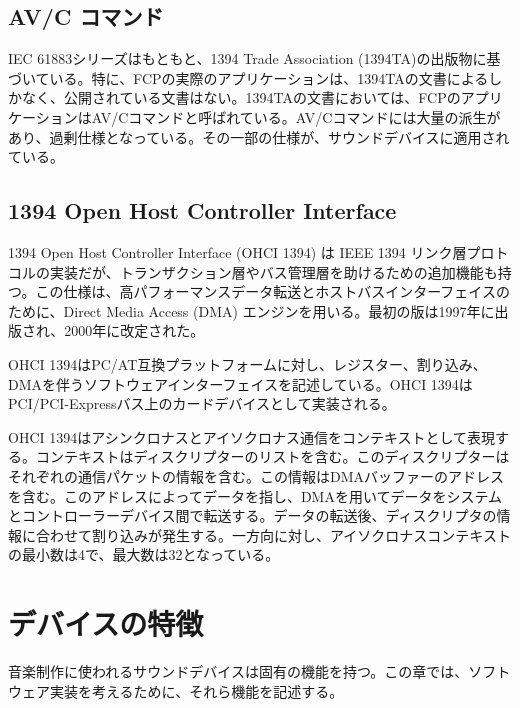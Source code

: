 \documentclass[onecolumn]{jarticle}
\begin{document}
\subsection{AV/C コマンド}

IEC 61883シリーズはもともと、1394 Trade Association (1394TA)の出版物に基づいている。特に、FCPの実際のアプリケーションは、1394TAの文書によるしかなく、公開されている文書はない。1394TAの文書においては、FCPのアプリケーションはAV/Cコマンドと呼ばれている。AV/Cコマンドには大量の派生があり、過剰仕様となっている。その一部の仕様が、サウンドデバイスに適用されている\cite{avc-general-4-2, avc-audio-1, avc-connection-1, avc-music-1, avc-descriptor-1, avc-info-block-1, avc-general-enhancement, avc-stream-format-1, avc-stream-format-1-1, avc-rate-control}。

\subsection{1394 Open Host Controller Interface}
\label{ohci-1394}

1394 Open Host Controller Interface (OHCI 1394) は IEEE 1394 リンク層プロトコルの実装だが、トランザクション層やバス管理層を助けるための追加機能も持つ。この仕様は、高パフォーマンスデータ転送とホストバスインターフェイスのために、Direct Media Access (DMA) エンジンを用いる。最初の版は1997年に出版され\cite{ohci1394-1}、2000年に改定された\cite{ohci1394-1-1}。

OHCI 1394はPC/AT互換プラットフォームに対し、レジスター、割り込み、DMAを伴うソフトウェアインターフェイスを記述している。OHCI 1394はPCI/PCI-Expressバス上のカードデバイスとして実装される。

OHCI 1394はアシンクロナスとアイソクロナス通信をコンテキストとして表現する。コンテキストはディスクリプターのリストを含む。このディスクリプターはそれぞれの通信パケットの情報を含む。この情報はDMAバッファーのアドレスを含む。このアドレスによってデータを指し、DMAを用いてデータをシステムとコントローラーデバイス間で転送する。データの転送後、ディスクリプタの情報に合わせて割り込みが発生する。一方向に対し、アイソクロナスコンテキストの最小数は4で、最大数は32となっている。


\section{デバイスの特徴}

音楽制作に使われるサウンドデバイスは固有の機能を持つ。この章では、ソフトウェア実装を考えるために、それら機能を記述する。
\end{document}
